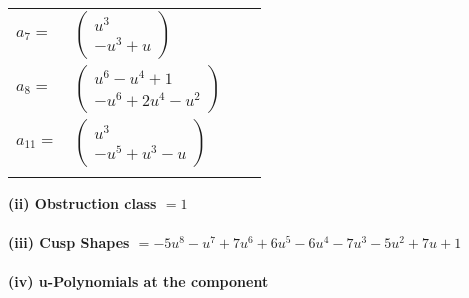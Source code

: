\documentclass[1p]{elsarticle_modified}
\theoremstyle{definition}
\begin{document}
\begin{tabular}{m{7pt} m{180pt} m{7pt} m{180pt} }
\flushright $a_{7}=$&$\begin{pmatrix}u^3\\- u^3+u\end{pmatrix}$ \\
\flushright $a_{8}=$&$\begin{pmatrix}u^6- u^4+1\\- u^6+2 u^4- u^2\end{pmatrix}$ \\
\flushright $a_{11}=$&$\begin{pmatrix}u^3\\- u^5+u^3- u\end{pmatrix}$\\&\end{tabular}
\flushleft \textbf{(ii) Obstruction class $= 1$}\\~\\
\flushleft \textbf{(iii) Cusp Shapes $= -5 u^8- u^7+7 u^6+6 u^5-6 u^4-7 u^3-5 u^2+7 u+1$}\\~\\
\newpage\renewcommand{\arraystretch}{1}
\flushleft \textbf{(iv) u-Polynomials at the component}\newline \\
\end{document}
